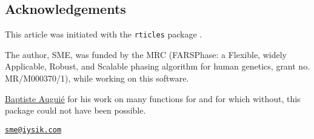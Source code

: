 \subsection{Acknowledgements}

This article was initiated with the \texttt{rticles} package
\citep{rticles}.

The author, SME, was funded by the MRC (FARSPhase: a Flexible, widely
Applicable, Robust, and Scalable phasing algorithm for human genetics,
grant no. MR/M000370/1), while working on this software.

\href{https://baptiste.github.io/}{Baptiste Augui\'{e}} for his work on
many functions for  and  for which
without, this package could not have been possible.



\address{%
Stefan McKinnon Edwards\\
The Roslin Insititute, University of Edinburgh\\
Easter Bush\\ Midlothian\\ EH25 9RG\\ Scotland, UK\\ true\\
}
\href{mailto:sme@iysik.com}{\nolinkurl{sme@iysik.com}}

